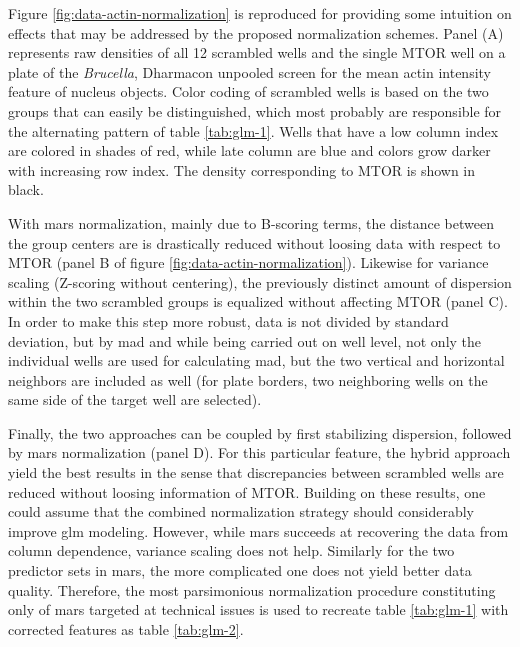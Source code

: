 

Figure \ref{fig:data-actin-normalization} is reproduced for providing some intuition on effects that may be addressed by the proposed normalization schemes. Panel (A) represents raw densities of all 12 scrambled wells and the single MTOR well on a plate of the \textit{Brucella}, Dharmacon unpooled screen for the mean actin intensity feature of nucleus objects. Color coding of scrambled wells is based on the two groups that can easily be distinguished, which most probably are responsible for the alternating pattern of table \ref{tab:glm-1}. Wells that have a low column index are colored in shades of red, while late column are blue and colors grow darker with increasing row index. The density corresponding to MTOR is shown in black.

With \gls{mars} normalization, mainly due to B-scoring terms, the distance between the group centers are is drastically reduced without loosing data with respect to MTOR (panel B of figure \ref{fig:data-actin-normalization}). Likewise for variance scaling (Z-scoring without centering), the previously distinct amount of dispersion within the two scrambled groups is equalized without affecting MTOR (panel C). In order to make this step more robust, data is not divided by standard deviation, but by \gls{mad} and while being carried out on well level, not only the individual wells are used for calculating \gls{mad}, but the two vertical and horizontal neighbors are included as well (for plate borders, two neighboring wells on the same side of the target well are selected).

Finally, the two approaches can be coupled by first stabilizing dispersion, followed by \gls{mars} normalization (panel D). For this particular feature, the hybrid approach yield the best results in the sense that discrepancies between scrambled wells are reduced without loosing information of MTOR. Building on these results, one could assume that the combined normalization strategy should considerably improve \gls{glm} modeling. However, while \gls{mars} succeeds at recovering the data from column dependence, variance scaling does not help. Similarly for the two predictor sets in \gls{mars}, the more complicated one does not yield better data quality. Therefore, the most parsimonious normalization procedure constituting only of \gls{mars} targeted at technical issues is used to recreate table \ref{tab:glm-1} with corrected features as table \ref{tab:glm-2}.


